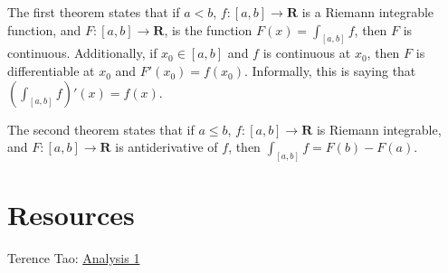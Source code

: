 \documentclass[answers,12pt]{exam}
\begin{document}
The first theorem states that if $a < b$, $f:[a,b] \to \mathbf{R}$ is a Riemann integrable function, and $F:[a,b] \to \mathbf{R}$, is the function $F(x) = \int_{[a,b]} f$, then $F$ is continuous.
Additionally, if $x_0 \in [a,b]$ and $f$ is continuous at $x_0$, then $F$ is differentiable at $x_0$ and $F'(x_0) = f(x_0)$.
Informally, this is saying that $(\int_{[a,b]}f)'(x) = f(x)$.

The second theorem states that if $a \leq b$, $f: [a,b] \to \mathbf{R}$ is Riemann integrable, and $F: [a,b] \to \mathbf{R}$ is antiderivative of $f$, then $\int_{[a,b]}f = F(b)-F(a)$.

\section{Resources}
Terence Tao: \href{https://terrytao.wordpress.com/books/analysis-i/}{Analysis 1}
\end{document}
